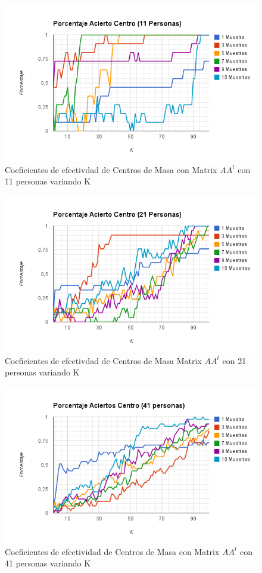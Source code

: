 \begin{figure}[H]
\includegraphics[width=1\textwidth]{img/imagem.png}
     \caption{Coeficientes de efectivdad de Centros de Masa con Matrix $AA^t$ con 11 personas variando K}
\end{figure}

\begin{figure}[H]
\includegraphics[width=1\textwidth]{img/imagen.png}
     \caption{Coeficientes de efectivdad de Centros de Masa Matrix $AA^t$ con 21 personas variando K}
\end{figure}

\begin{figure}[H]
\includegraphics[width=1\textwidth]{img/imager.png}
     \caption{Coeficientes de efectividad de Centros de Masa con Matrix $AA^t$ con 41 personas variando K}
\end{figure}

